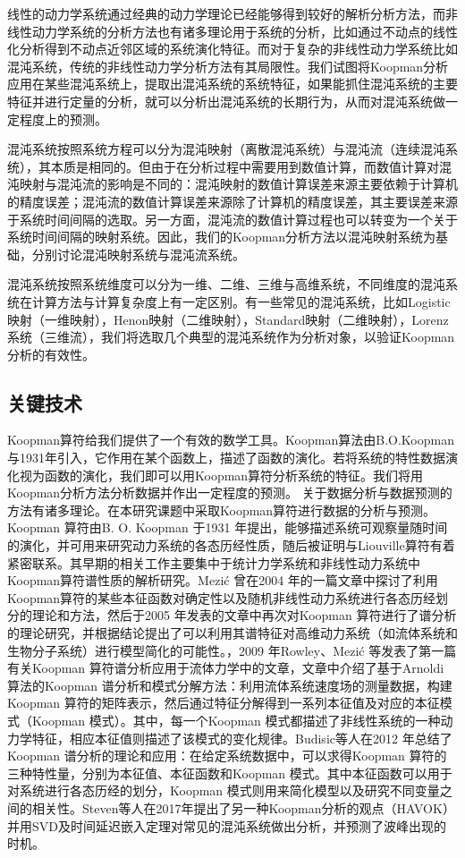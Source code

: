 线性的动力学系统通过经典的动力学理论已经能够得到较好的解析分析方法，而非线性动力学系统的分析方法也有诸多理论用于系统的分析，比如通过不动点的线性化分析得到不动点近邻区域的系统演化特征。而对于复杂的非线性动力学系统比如混沌系统，传统的非线性动力学分析方法有其局限性。我们试图将Koopman分析应用在某些混沌系统上，提取出混沌系统的系统特征，如果能抓住混沌系统的主要特征并进行定量的分析，就可以分析出混沌系统的长期行为，从而对混沌系统做一定程度上的预测。

混沌系统按照系统方程可以分为混沌映射（离散混沌系统）与混沌流（连续混沌系统），其本质是相同的。但由于在分析过程中需要用到数值计算，而数值计算对混沌映射与混沌流的影响是不同的：混沌映射的数值计算误差来源主要依赖于计算机的精度误差；混沌流的数值计算误差来源除了计算机的精度误差，其主要误差来源于系统时间间隔的选取。另一方面，混沌流的数值计算过程也可以转变为一个关于系统时间间隔的映射系统。因此，我们的Koopman分析方法以混沌映射系统为基础，分别讨论混沌映射系统与混沌流系统。

混沌系统按照系统维度可以分为一维、二维、三维与高维系统，不同维度的混沌系统在计算方法与计算复杂度上有一定区别。有一些常见的混沌系统，比如Logistic映射（一维映射），Henon映射（二维映射），Standard映射（二维映射），Lorenz系统（三维流），我们将选取几个典型的混沌系统作为分析对象，以验证Koopman分析的有效性。

\subsection{关键技术}
Koopman算符给我们提供了一个有效的数学工具。Koopman算法由B.O.Koopman与1931年引入，它作用在某个函数上，描述了函数的演化。若将系统的特性数据演化视为函数的演化，我们即可以用Koopman算符分析系统的特征。我们将用Koopman分析方法分析数据并作出一定程度的预测。
关于数据分析与数据预测的方法有诸多理论。在本研究课题中采取Koopman算符进行数据的分析与预测。Koopman 算符由B. O. Koopman 于1931 年提出，能够描述系统可观察量随时间的演化，并可用来研究动力系统的各态历经性质，随后被证明与Liouville算符有着紧密联系。其早期的相关工作主要集中于统计力学系统和非线性动力系统中Koopman算符谱性质的解析研究。Mezić 曾在2004 年的一篇文章中探讨了利用Koopman算符的某些本征函数对确定性以及随机非线性动力系统进行各态历经划分的理论和方法，然后于2005 年发表的文章中再次对Koopman 算符进行了谱分析的理论研究，并根据结论提出了可以利用其谱特征对高维动力系统（如流体系统和生物分子系统）进行模型简化的可能性。，2009 年Rowley、Mezić 等发表了第一篇有关Koopman 算符谱分析应用于流体力学中的文章，文章中介绍了基于Arnoldi 算法的Koopman 谱分析和模式分解方法：利用流体系统速度场的测量数据，构建Koopman 算符的矩阵表示，然后通过特征分解得到一系列本征值及对应的本征模式（Koopman 模式）。其中，每一个Koopman 模式都描述了非线性系统的一种动力学特征，相应本征值则描述了该模式的变化规律。Budisic等人在2012 年总结了Koopman 谱分析的理论和应用：在给定系统数据中，可以求得Koopman 算符的三种特性量，分别为本征值、本征函数和Koopman 模式。其中本征函数可以用于对系统进行各态历经的划分，Koopman 模式则用来简化模型以及研究不同变量之间的相关性。Steven等人在2017年提出了另一种Koopman分析的观点（HAVOK）并用SVD及时间延迟嵌入定理对常见的混沌系统做出分析，并预测了波峰出现的时机。


